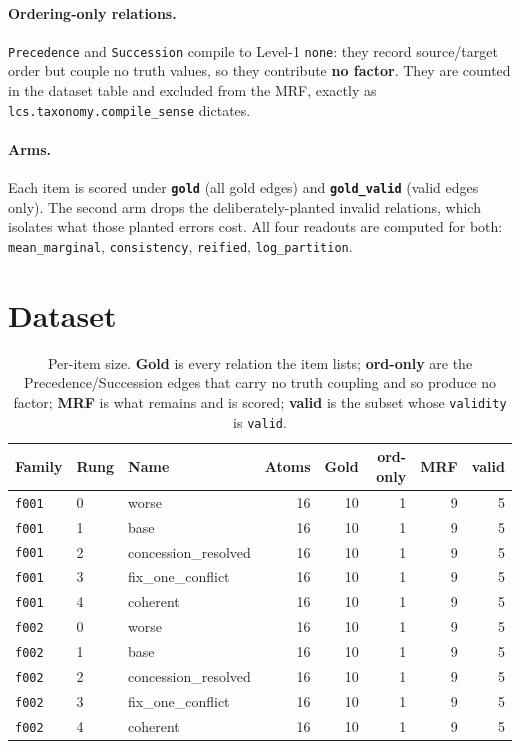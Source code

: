 \documentclass[11pt]{article}
\begin{document}
\paragraph{Ordering-only relations.} \texttt{Precedence} and \texttt{Succession} compile to Level-1 \texttt{none}: they record source/target order but couple no truth values, so they contribute \textbf{no factor}. They are counted in the dataset table and excluded from the MRF, exactly as \texttt{lcs.taxonomy.compile\_sense} dictates.

\paragraph{Arms.} Each item is scored under \textbf{\texttt{gold}} (all gold edges) and \textbf{\texttt{gold\_valid}} (valid edges only). The second arm drops the deliberately-planted invalid relations, which isolates what those planted errors cost. All four readouts are computed for both: \texttt{mean\_marginal}, \texttt{consistency}, \texttt{reified}, \texttt{log\_partition}.

\section{Dataset}

\begin{table}[htbp]
\centering
\small
\caption{Per-item size. \textbf{Gold} is every relation the item lists; \textbf{ord-only} are the Precedence/Succession edges that carry no truth coupling and so produce no factor; \textbf{MRF} is what remains and is scored; \textbf{valid} is the subset whose \texttt{validity} is \texttt{valid}.}
\label{tab:dataset}
\begin{tabular}{lllrrrrr}
\toprule
Family & Rung & Name & Atoms & Gold & ord-only & MRF & valid \\
\midrule
\texttt{f001} & 0 & worse & 16 & 10 & 1 & 9 & 5 \\
\texttt{f001} & 1 & base & 16 & 10 & 1 & 9 & 5 \\
\texttt{f001} & 2 & concession\_resolved & 16 & 10 & 1 & 9 & 5 \\
\texttt{f001} & 3 & fix\_one\_conflict & 16 & 10 & 1 & 9 & 5 \\
\texttt{f001} & 4 & coherent & 16 & 10 & 1 & 9 & 5 \\
\texttt{f002} & 0 & worse & 16 & 10 & 1 & 9 & 5 \\
\texttt{f002} & 1 & base & 16 & 10 & 1 & 9 & 5 \\
\texttt{f002} & 2 & concession\_resolved & 16 & 10 & 1 & 9 & 5 \\
\texttt{f002} & 3 & fix\_one\_conflict & 16 & 10 & 1 & 9 & 5 \\
\texttt{f002} & 4 & coherent & 16 & 10 & 1 & 9 & 5 \\
\bottomrule
\end{tabular}
\end{table}
\end{document}
